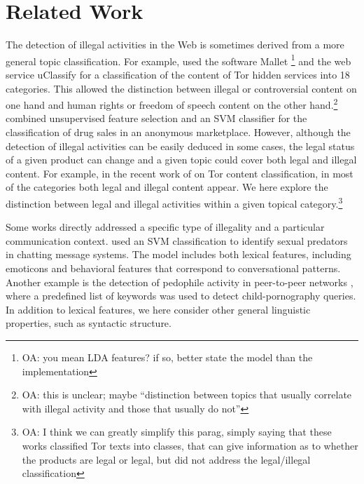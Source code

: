 \documentclass[11pt,a4paper,table]{article}
\newcommand{\oa}[1]{\footnote{\color{red}OA: #1}}
\begin{document}
\section{Related Work}

The detection of illegal activities in the Web is sometimes derived from a more general topic classification. For example, \citet{Biryukov14} used the software Mallet \citep{McCallum02}\oa{you mean LDA features? if so, better state the model than the implementation} and the web service uClassify \citep{Kagstrom13} for a classification of the content of Tor hidden services into 18 categories. This allowed the distinction between illegal or controversial content on one hand and human rights or freedom of speech content on the other hand.\oa{this is unclear; maybe ``distinction between topics that usually correlate with illegal activity and those that usually do not''} 
\citet{GraczykKinningham15} combined unsupervised feature selection and an SVM classifier for the classification of drug sales in an anonymous marketplace. However, although the detection of illegal activities can be easily deduced in some cases, the legal status of a given product can change \citep{GraczykKinningham15} and a given topic could cover both legal and illegal content. For example, in the recent work of \citet{Avarikioti18} on Tor content classification, in most of the categories both legal and illegal content appear. We here explore the distinction between legal and illegal activities within a given topical category.\oa{I think we can greatly simplify this parag, simply saying that these works classified Tor texts into classes, that can give information as to whether the products are legal or legal, but did not address the legal/illegal classification}

Some works directly addressed a specific type of illegality and a particular communication context. \citet{MorrisHirst12} used an SVM classification to identify sexual predators in chatting message systems. The model includes both lexical features, including emoticons and behavioral features that correspond to conversational patterns. Another example is the detection of pedophile activity in peer-to-peer networks \citep{Latapy13}, where a predefined list of keywords was used to detect child-pornography queries. In addition to lexical features, we here consider other general linguistic properties, such as syntactic structure.%
\end{document}
